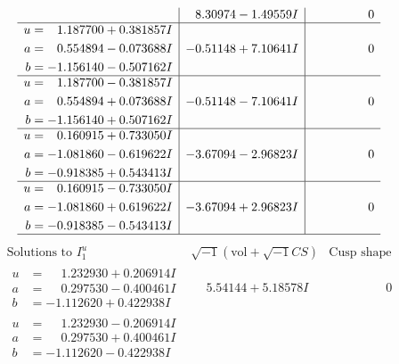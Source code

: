 \documentclass[1p]{elsarticle_modified}
\theoremstyle{definition}
\newcommand{\I}{\sqrt{-1}}
\begin{document}
$$\begin{array}{c|c|c}
 & \phantom{-}8.30974 - 1.49559 I & \phantom{-0.000000 } 0 \\ \hline\begin{aligned}
u &= \phantom{-}1.187700 + 0.381857 I \\
a &= \phantom{-}0.554894 - 0.073688 I \\
b &= -1.156140 - 0.507162 I\end{aligned}
 & -0.51148 + 7.10641 I & \phantom{-0.000000 } 0 \\ \hline\begin{aligned}
u &= \phantom{-}1.187700 - 0.381857 I \\
a &= \phantom{-}0.554894 + 0.073688 I \\
b &= -1.156140 + 0.507162 I\end{aligned}
 & -0.51148 - 7.10641 I & \phantom{-0.000000 } 0 \\ \hline\begin{aligned}
u &= \phantom{-}0.160915 + 0.733050 I \\
a &= -1.081860 - 0.619622 I \\
b &= -0.918385 + 0.543413 I\end{aligned}
 & -3.67094 - 2.96823 I & \phantom{-0.000000 } 0 \\ \hline\begin{aligned}
u &= \phantom{-}0.160915 - 0.733050 I \\
a &= -1.081860 + 0.619622 I \\
b &= -0.918385 - 0.543413 I\end{aligned}
 & -3.67094 + 2.96823 I & \phantom{-0.000000 } 0\\
 \hline 
 \end{array}$$\newpage$$\begin{array}{c|c|c}  
\text{Solutions to }I^u_{1}& \I (\text{vol} + \sqrt{-1}CS) & \text{Cusp shape}\\
 \hline 
\begin{aligned}
u &= \phantom{-}1.232930 + 0.206914 I \\
a &= \phantom{-}0.297530 - 0.400461 I \\
b &= -1.112620 + 0.422938 I\end{aligned}
 & \phantom{-}5.54144 + 5.18578 I & \phantom{-0.000000 } 0 \\ \hline\begin{aligned}
u &= \phantom{-}1.232930 - 0.206914 I \\
a &= \phantom{-}0.297530 + 0.400461 I \\
b &= -1.112620 - 0.422938 I\end{aligned}

\end{array}$$
\end{document}
